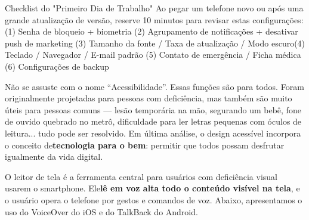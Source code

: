 \begin{tcbinfo}{Checklist do "Primeiro Dia de Trabalho"}
Ao pegar um telefone novo ou após uma grande atualização de versão, reserve 10 minutos para revisar estas configurações:\newline (1) Senha de bloqueio + biometria (2) Agrupamento de notificações + desativar push de marketing (3) Tamanho da fonte / Taxa de atualização / Modo escuro\newline (4) Teclado / Navegador / E-mail padrão (5) Contato de emergência / Ficha médica (6) Configurações de backup

\end{tcbinfo}


Não se assuste com o nome “Acessibilidade”. Essas funções são para todos. Foram originalmente projetadas para pessoas com deficiência, mas também são muito úteis para pessoas comuns — lesão temporária na mão, segurando um bebê, fone de ouvido quebrado no metrô, dificuldade para ler letras pequenas com óculos de leitura... tudo pode ser resolvido. Em última análise, o design acessível incorpora o conceito de\textbf{tecnologia para o bem}: permitir que todos possam desfrutar igualmente da vida digital.


O leitor de tela é a ferramenta central para usuários com deficiência visual usarem o smartphone. Ele\textbf{lê em voz alta todo o conteúdo visível na tela}, e o usuário opera o telefone por gestos e comandos de voz. Abaixo, apresentamos o uso do VoiceOver do iOS e do TalkBack do Android.

